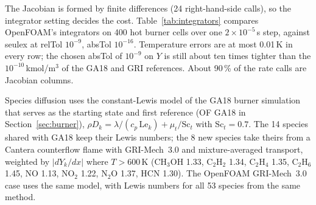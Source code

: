 \documentclass[preprint,review,12pt]{elsarticle}
\newcommand{\ce}[1]{\ensuremath{\mathrm{#1}}}
\begin{document}
The Jacobian is formed by finite differences (24 right-hand-side calls), so the integrator setting decides the cost.
Table~\ref{tab:integrators} compares OpenFOAM's integrators on 400 hot burner cells over one $2\times10^{-5}$\,s
step, against seulex at relTol $10^{-9}$, absTol $10^{-16}$. Temperature errors are at most 0.01\,K in every row; the
chosen absTol of $10^{-9}$ on $Y$ is still about ten times tighter than the $10^{-10}$\,kmol/m$^3$ of the GA18 and
GRI references. About 90\,\% of the rate calls are Jacobian columns.

\begin{table}[t]
\centering\small
\caption{ODE integrators for the ARC on 400 hot burner cells, one flow step of $2\times10^{-5}$\,s.}
\label{tab:integrators}
\end{table}

Species diffusion uses the constant-Lewis model of the GA18 burner simulation that serves as the starting state and first reference (OF GA18 in Section~\ref{sec:burner}),
$\rho D_k=\lambda/(c_p\,\mathrm{Le}_k)+\mu_t/\mathrm{Sc}_t$ with $\mathrm{Sc}_t=0.7$. The 14 species shared with GA18
keep their Lewis numbers; the 8 new species take theirs from a Cantera counterflow flame with GRI-Mech~3.0 and
mixture-averaged transport, weighted by $|dY_k/dx|$ where $T>600$\,K (\ce{CH_{3}OH} 1.33, \ce{C_{2}H_{2}} 1.34, \ce{C_{2}H_{4}}
1.35, \ce{C_{2}H_{6}} 1.45, NO 1.13, \ce{NO_{2}} 1.22, \ce{N_{2}O} 1.37, HCN 1.30). The OpenFOAM GRI-Mech~3.0 case uses the same
model, with Lewis numbers for all 53 species from the same method.

\end{document}

